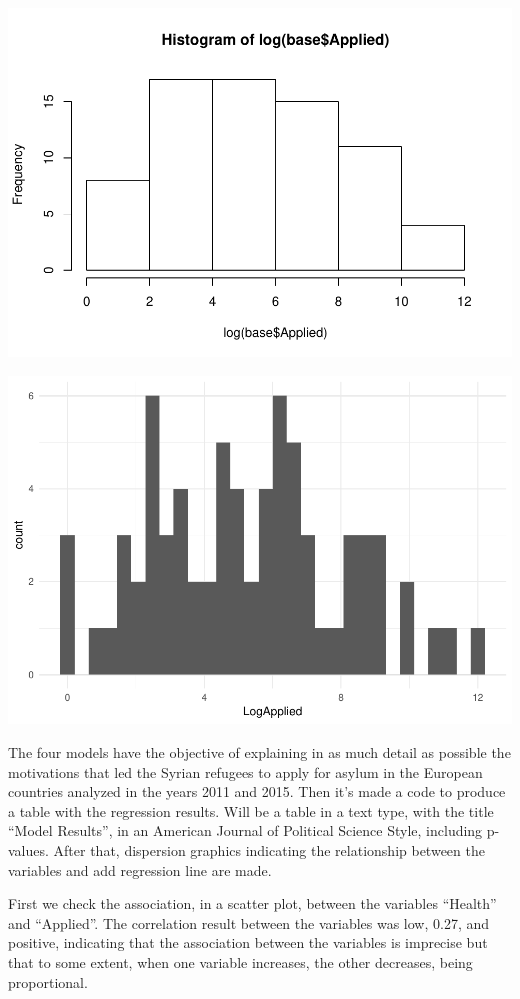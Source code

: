 \documentclass[]{elsarticle} %
\makeatletter
\def\maxwidth{\ifdim\Gin@nat@width>\linewidth\linewidth
\else\Gin@nat@width\fi}
\let\Oldincludegraphics\includegraphics
\renewcommand{\includegraphics}[1]{\Oldincludegraphics[width=\maxwidth]{#1}}
\makeatother
\begin{document}
\includegraphics{refugees-stephanie_files/figure-latex/histo_2-1.pdf}

\includegraphics{refugees-stephanie_files/figure-latex/base_log-1.pdf}

The four models have the objective of explaining in as much detail as
possible the motivations that led the Syrian refugees to apply for
asylum in the European countries analyzed in the years 2011 and 2015.
Then it's made a code to produce a table with the regression results.
Will be a table in a text type, with the title ``Model Results'', in an
American Journal of Political Science Style, including p-values. After
that, dispersion graphics indicating the relationship between the
variables and add regression line are made.

First we check the association, in a scatter plot, between the variables
``Health'' and ``Applied''. The correlation result between the variables
was low, 0.27, and positive, indicating that the association between the
variables is imprecise but that to some extent, when one variable
increases, the other decreases, being proportional.
\end{document}

